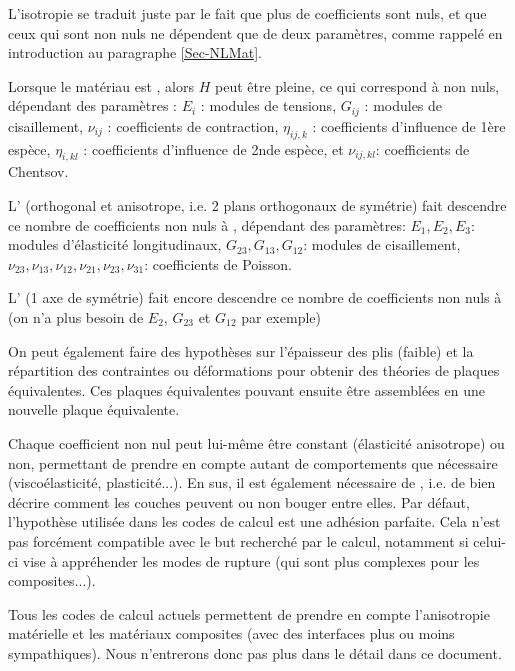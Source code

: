 L'isotropie se traduit juste par le fait que plus de coefficients sont nuls, 
et que ceux qui sont non nuls ne dépendent que de deux paramètres, comme rappelé 
en introduction au paragraphe \ref{Sec-NLMat}.

\medskip
Lorsque le matériau est , alors $H$ peut être pleine, ce qui correspond à
 non nuls, dépendant des paramètres :
$E_i$ : modules de tensions, $G_{ij}$ : modules de cisaillement, $\nu_{ij}$ : coefficients de contraction,
$\eta_{ij,k}$ : coefficients d'influence de 1ère espèce, $\eta_{i,kl}$ : coefficients d'influence de 
2nde espèce, et $\nu_{ij,kl}$: coefficients de Chentsov.

L' (orthogonal et anisotrope, i.e. 2 plans orthogonaux de symétrie) fait descendre 
ce nombre de coefficients non nuls à , dépendant des paramètres: $E_1, E_2, E_3$: 
modules d'élasticité longitudinaux, $G_{23}, G_{13}, G_{12}$: modules de cisaillement, $\nu_{23}, \nu_{13},
 \nu_{12}, \nu_{21}, \nu_{23}, \nu_{31}$: coefficients de Poisson.

L' (1 axe de symétrie) fait encore descendre ce nombre de 
coefficients non nuls à  (on n'a plus besoin de $E_2$, $G_{23}$ et $G_{12}$ par 
exemple)

\medskip
On peut également faire des hypothèses sur l'épaisseur des plis (faible) et la répartition des contraintes
ou déformations pour obtenir des théories de plaques équivalentes.
Ces plaques équivalentes pouvant ensuite être assemblées en une nouvelle plaque équivalente.

\medskip
Chaque coefficient non nul peut lui-même être constant (élasticité anisotrope) ou non, permettant
de prendre en compte autant de comportements que nécessaire (viscoélasticité, plasticité...).
En sus, il est également nécessaire de , i.e. de bien
décrire comment les couches peuvent ou non bouger entre elles. Par défaut, l'hypothèse
utilisée dans les codes de calcul est une adhésion parfaite. Cela n'est pas forcément compatible
avec le but recherché par le calcul, notamment si celui-ci vise à appréhender les modes
de rupture (qui sont plus complexes pour les composites...).

\medskip
Tous les codes de calcul actuels permettent de prendre en compte l'anisotropie matérielle
et les matériaux composites (avec des interfaces plus ou moins sympathiques).
Nous n'entrerons donc pas plus dans le détail dans ce document.






